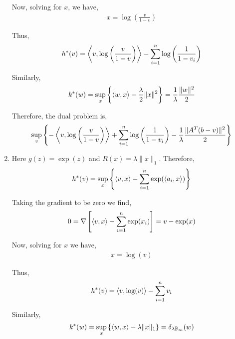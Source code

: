 \documentclass[10pt]{article}
\begin{document}
\begin{solution}[Solution]
\begin{enumerate}[label=(\alph*)]
        Now, solving for \( x \), we have,
        \begin{align*}
            x = \log \left( \frac{v}{1-v} \right)
        \end{align*}
        
        Thus,
        \begin{align*}
            h^*(v) = \left\langle v,\log \left( \frac{v}{1-v} \right) \right\rangle - \sum_{i=1}^{n} \log \left( \frac{1}{1-v_i} \right)
        \end{align*}
        
        

        Similarly,
        \begin{align*}
            k^*(w) = \sup_{x} \left\{ \left\langle w,x \right\rangle - \frac{\lambda}{2}\| x\|^2 \right\}
            = \frac{1}{\lambda}\frac{ \| w \|^2}{2} 
        \end{align*}
       
        Therefore, the dual problem is,
        \begin{align*}
            \sup_v \left\{ 
            - \left\langle v,\log \left( \frac{v}{1-v} \right) \right\rangle + \sum_{i=1}^{n} \log \left( \frac{1}{1-v_i} \right) 
            - \frac{1}{\lambda} \frac{\| A^T(b-v) \|^2}{2}\right\}
        \end{align*}
        
        
    \item Here \( g(z) = \exp(z) \) and \( R(x) = \lambda\| x \|_1 \). Therefore,
        \begin{align*}
            h^*(v)
            = 
            \sup_x \left\{ \left\langle v,x \right\rangle - \sum_{i=1}^{n} \exp(\left\langle a_i,x \right\rangle) \right\}
        \end{align*}
        
        Taking the gradient to be zero we find,
        \begin{align*}
            0 = \nabla \left[ \left\langle v,x \right\rangle - \sum_{i=1}^{n} \exp(x_i) \right]
            = v - \exp(x)
        \end{align*}
        
        Now, solving for \( x \) we have,
        \begin{align*}
            x = \log(v)
        \end{align*}
        
        Thus,
        \begin{align*}
            h^*(v) = \left\langle v,\log(v) \right\rangle - \sum_{i=1}^{n} v_i
        \end{align*}
        
        Similarly,
        \begin{align*}
            k^*(w) = \sup_x \left\{ \left\langle w,x \right\rangle - \lambda \| x \|_1 \right\}
            = \delta_{\lambda \mathbb{B}_\infty}(w)
        \end{align*}


\end{enumerate}
\end{solution}
\end{document}
